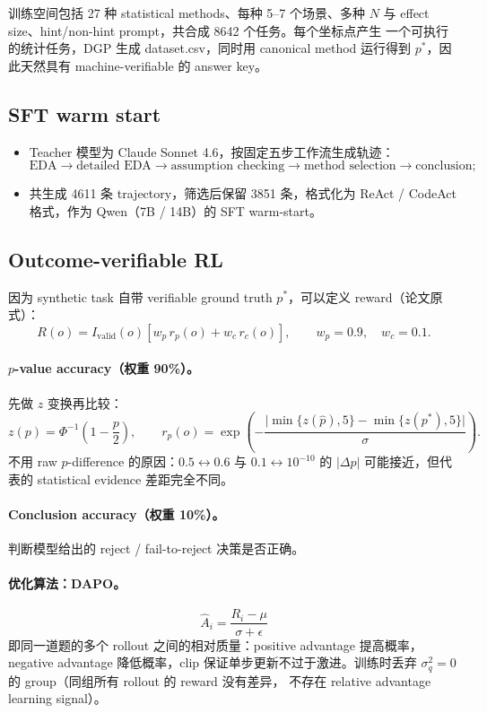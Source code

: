 \documentclass[12pt]{ctexart}
\begin{document}
训练空间包括 27 种 statistical methods、每种 5--7 个场景、多种 $N$ 与
effect size、hint/non-hint prompt，共合成 8642 个任务。每个坐标点产生
一个可执行的统计任务，DGP 生成 dataset.csv，同时用 canonical method
运行得到 $p^{*}$，因此天然具有 machine-verifiable 的 answer key。

\subsection{SFT warm start}

\begin{itemize}
  \item Teacher 模型为 Claude Sonnet 4.6，按固定五步工作流生成轨迹：
  \[
    \text{EDA} \rightarrow \text{detailed EDA}
    \rightarrow \text{assumption checking}
    \rightarrow \text{method selection}
    \rightarrow \text{conclusion};
  \]
  \item 共生成 4611 条 trajectory，筛选后保留 3851 条，格式化为
        ReAct / CodeAct 格式，作为 Qwen（7B / 14B）的 SFT warm-start。
\end{itemize}

\subsection{Outcome-verifiable RL}

因为 synthetic task 自带 verifiable ground truth $p^{*}$，可以定义
reward（论文原式）：
\[
  R(o) = I_{\mathrm{valid}}(o)\left[w_p\, r_p(o) + w_c\, r_c(o)\right],
  \qquad w_p = 0.9,\quad w_c = 0.1.
\]

\paragraph{$p$-value accuracy（权重 90\%）。}
先做 $z$ 变换再比较：
\[
  z(p) = \Phi^{-1}\!\left(1 - \frac{p}{2}\right),
  \qquad
  r_p(o) = \exp\!\left(
    -\frac{\bigl|\min\{z(\hat p),5\} - \min\{z(p^{*}),5\}\bigr|}{\sigma}
  \right).
\]
不用 raw $p$-difference 的原因：$0.5\leftrightarrow 0.6$ 与
$0.1\leftrightarrow 10^{-10}$ 的 $|\Delta p|$ 可能接近，但代表的
statistical evidence 差距完全不同。

\paragraph{Conclusion accuracy（权重 10\%）。}
判断模型给出的 reject / fail-to-reject 决策是否正确。

\paragraph{优化算法：DAPO。}
\[
  \hat A_i = \frac{R_i - \mu}{\sigma + \epsilon}
\]
即同一道题的多个 rollout 之间的相对质量：positive advantage 提高概率，
negative advantage 降低概率，clip 保证单步更新不过于激进。训练时丢弃
$\sigma_q^2 = 0$ 的 group（同组所有 rollout 的 reward 没有差异，
不存在 relative advantage learning signal）。
\end{document}
